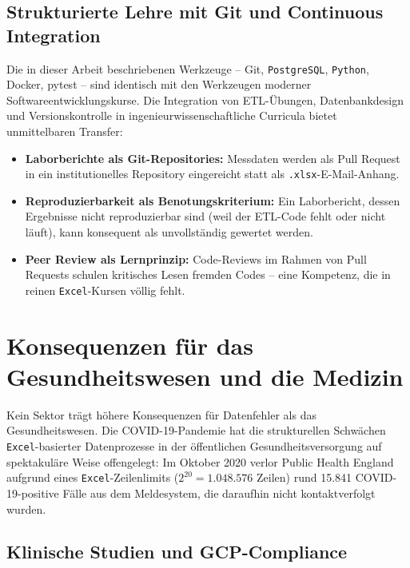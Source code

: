 ﻿\documentclass[12pt,a4paper]{report}
\theoremstyle{definition}
\theoremstyle{remark}
\newcommand{\excel}{\texttt{Excel}}
\newcommand{\pg}{\texttt{PostgreSQL}}
\newcommand{\py}{\texttt{Python}}
\newcommand{\code}[1]{\texttt{#1}}
\begin{document}
\subsection{Strukturierte Lehre mit Git und Continuous Integration}

Die in dieser Arbeit beschriebenen Werkzeuge -- Git, \pg{}, \py{},
Docker, pytest -- sind identisch mit den Werkzeugen moderner
Softwareentwicklungskurse.
Die Integration von ETL-Übungen, Datenbankdesign und Versionskontrolle
in ingenieurwissenschaftliche Curricula bietet unmittelbaren Transfer:
\begin{itemize}[leftmargin=1.5em, itemsep=2pt]
  \item \textbf{Laborberichte als Git-Repositories:} Messdaten werden
        als Pull Request in ein institutionelles Repository eingereicht
        statt als \code{.xlsx}-E-Mail-Anhang.
  \item \textbf{Reproduzierbarkeit als Benotungskriterium:}
        Ein Laborbericht, dessen Ergebnisse nicht reproduzierbar sind
        (weil der ETL-Code fehlt oder nicht läuft), kann konsequent
        als unvollständig gewertet werden.
  \item \textbf{Peer Review als Lernprinzip:}
        Code-Reviews im Rahmen von Pull Requests schulen kritisches
        Lesen fremden Codes -- eine Kompetenz, die in reinen
        \excel-Kursen völlig fehlt.
\end{itemize}

\section{Konsequenzen für das Gesundheitswesen und die Medizin}

Kein Sektor trägt höhere Konsequenzen für Datenfehler als das
Gesundheitswesen. Die COVID-19-Pandemie hat die strukturellen Schwächen
\excel-basierter Datenprozesse in der öffentlichen Gesundheitsversorgung
auf spektakuläre Weise offengelegt:
Im Oktober 2020 verlor Public Health England aufgrund eines
\excel-Zeilenlimits ($2^{20} = 1{.}048{.}576$ Zeilen) rund 15.841
COVID-19-positive Fälle aus dem Meldesystem, die daraufhin nicht
kontaktverfolgt wurden.

\subsection{Klinische Studien und GCP-Compliance}
\end{document}
